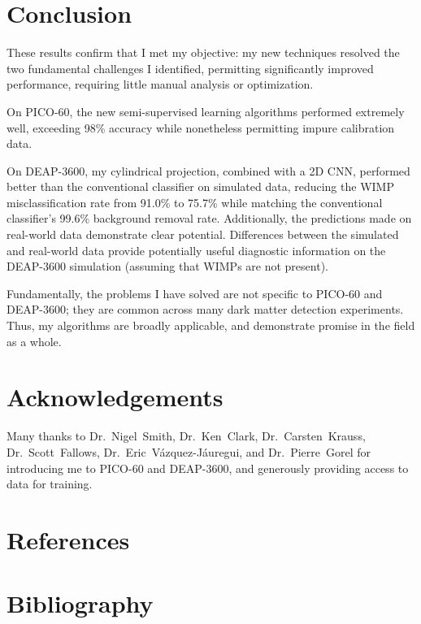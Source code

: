\documentclass[12pt]{article}
\begin{document}
\section{Conclusion}

These results confirm that I met my objective: my new techniques resolved the two fundamental challenges I identified, permitting significantly improved performance, requiring little manual analysis or optimization.

On PICO-60, the new semi-supervised learning algorithms performed extremely well, exceeding 98\% accuracy while nonetheless permitting impure calibration data.

On DEAP-3600, my cylindrical projection, combined with a 2D CNN, performed better than the conventional classifier on simulated data, reducing the WIMP misclassification rate from 91.0\% to 75.7\% while matching the conventional classifier's 99.6\% background removal rate. Additionally, the predictions made on real-world data demonstrate clear potential. Differences between the simulated and real-world data provide potentially useful diagnostic information on the DEAP-3600 simulation (assuming that WIMPs are not present).

Fundamentally, the problems I have solved are not specific to PICO-60 and DEAP-3600; they are common across many dark matter detection experiments. Thus, my algorithms are broadly applicable, and demonstrate promise in the field as a whole.

\section{Acknowledgements}

Many thanks to Dr.~Nigel~Smith, Dr.~Ken~Clark, Dr.~Carsten~Krauss, Dr.~Scott~Fallows, Dr.~Eric~V\'azquez-J\'auregui, and Dr.~Pierre~Gorel for introducing me to PICO-60 and DEAP-3600, and generously providing access to data for training.

\section{References}

\printbibliography[heading=none]

\pagebreak

\section{Bibliography}
\end{document}
